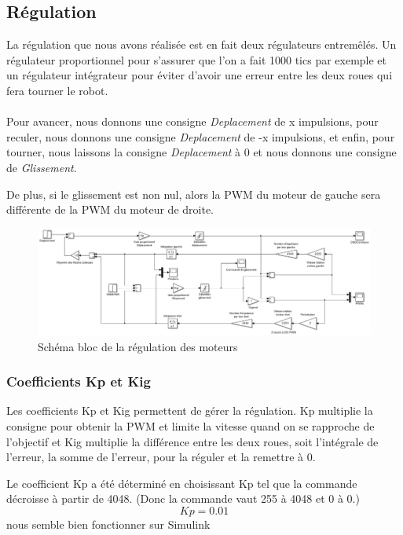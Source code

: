 \subsection{Régulation}
La régulation que nous avons réalisée est en fait deux régulateurs entremêlés. Un régulateur proportionnel pour s'assurer que l'on a fait 1000 tics par exemple et un régulateur intégrateur pour éviter d'avoir une erreur entre les deux roues qui fera tourner le robot.

\paragraph{}
Pour avancer, nous donnons une consigne \textit{Deplacement} de x impulsions, pour reculer, nous donnons une consigne \textit{Deplacement} de -x impulsions, et enfin, pour tourner, nous laissons la consigne \textit{Deplacement} à 0 et nous donnons une consigne de \textit{Glissement}.

\noindent De plus, si le glissement est non nul, alors la PWM du moteur de gauche sera différente de la PWM du moteur de droite.

\begin{figure}[!ht]
	\centering
	\includegraphics[width=15cm]{simulink.jpg}
	\caption{Schéma bloc de la régulation des moteurs}
	\label{img:simulink}
\end{figure}

\subsubsection{Coefficients Kp et Kig}
Les coefficients Kp et Kig permettent de gérer la régulation. Kp multiplie la consigne pour obtenir la PWM et limite la vitesse quand on se rapproche de l'objectif et Kig multiplie la différence entre les deux roues, soit l'intégrale de l'erreur, la somme de l'erreur, pour la réguler et la remettre à 0.

\noindent Le coefficient Kp a été déterminé en choisissant Kp tel que la commande décroisse à partir de 4048. (Donc la commande vaut 255 à 4048 et 0 à 0.) $$Kp = 0.01$$ nous semble bien fonctionner sur Simulink

